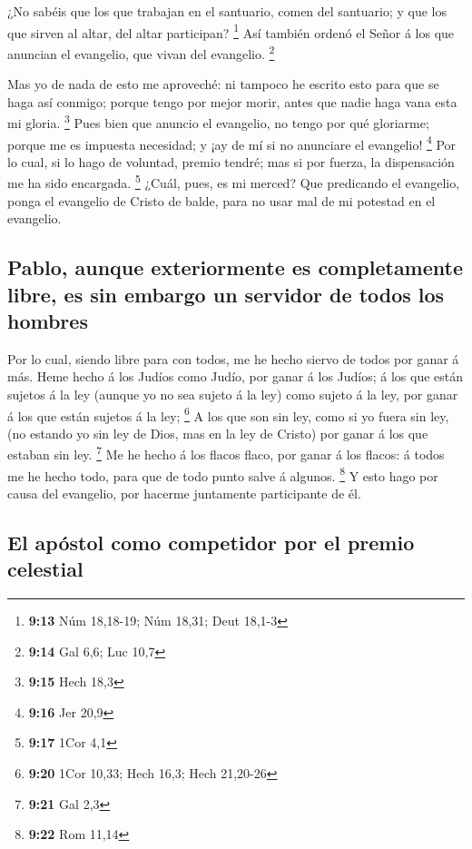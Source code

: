  ¿No sabéis que los que trabajan en el santuario, comen del
santuario; y que los que sirven al altar, del altar participan?
\footnote{\textbf{9:13} Núm 18,18-19; Núm 18,31; Deut 18,1-3}
 Así también ordenó el Señor á los que anuncian el
evangelio, que vivan del evangelio. \footnote{\textbf{9:14} Gal 6,6; Luc
  10,7}

 Mas yo de nada de esto me aproveché: ni tampoco he escrito
esto para que se haga así conmigo; porque tengo por mejor morir, antes
que nadie haga vana esta mi gloria. \footnote{\textbf{9:15} Hech 18,3}
 Pues bien que anuncio el evangelio, no tengo por qué
gloriarme; porque me es impuesta necesidad; y ¡ay de mí si no anunciare
el evangelio! \footnote{\textbf{9:16} Jer 20,9}  Por lo
cual, si lo hago de voluntad, premio tendré; mas si por fuerza, la
dispensación me ha sido encargada. \footnote{\textbf{9:17} 1Cor 4,1}
 ¿Cuál, pues, es mi merced? Que predicando el evangelio,
ponga el evangelio de Cristo de balde, para no usar mal de mi potestad
en el evangelio.

\hypertarget{pablo-aunque-exteriormente-es-completamente-libre-es-sin-embargo-un-servidor-de-todos-los-hombres}{%
\subsection{Pablo, aunque exteriormente es completamente libre, es sin
embargo un servidor de todos los
hombres}\label{pablo-aunque-exteriormente-es-completamente-libre-es-sin-embargo-un-servidor-de-todos-los-hombres}}

 Por lo cual, siendo libre para con todos, me he hecho
siervo de todos por ganar á más.  Heme hecho á los Judíos
como Judío, por ganar á los Judíos; á los que están sujetos á la ley
(aunque yo no sea sujeto á la ley) como sujeto á la ley, por ganar á los
que están sujetos á la ley; \footnote{\textbf{9:20} 1Cor 10,33; Hech
  16,3; Hech 21,20-26}  A los que son sin ley, como si yo
fuera sin ley, (no estando yo sin ley de Dios, mas en la ley de Cristo)
por ganar á los que estaban sin ley. \footnote{\textbf{9:21} Gal 2,3}
 Me he hecho á los flacos flaco, por ganar á los flacos: á
todos me he hecho todo, para que de todo punto salve á algunos.
\footnote{\textbf{9:22} Rom 11,14}  Y esto hago por causa
del evangelio, por hacerme juntamente participante de él.

\hypertarget{el-apuxf3stol-como-competidor-por-el-premio-celestial}{%
\subsection{El apóstol como competidor por el premio
celestial}\label{el-apuxf3stol-como-competidor-por-el-premio-celestial}}

